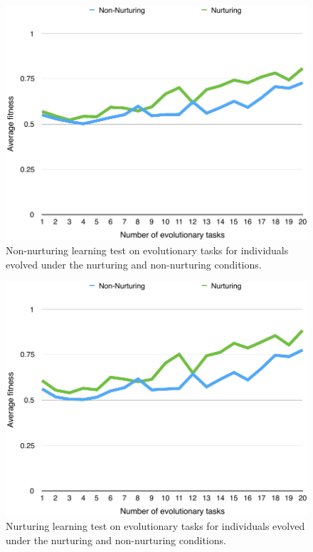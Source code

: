 \documentclass[master]{outhesis}
\begin{document}
\begin{figure}[H]
	\centering
	\includegraphics{NonNurturingLearningTestPlot.pdf}
	\caption{Non-nurturing learning test on evolutionary tasks for individuals evolved under the nurturing and non-nurturing conditions.}
\end{figure}

\begin{figure}[H]
	\centering
	\includegraphics{NurturingLearningTestPlot.pdf}
	\caption{Nurturing learning test on evolutionary tasks for individuals evolved under the nurturing and non-nurturing conditions.}
\end{figure}
\end{document}
